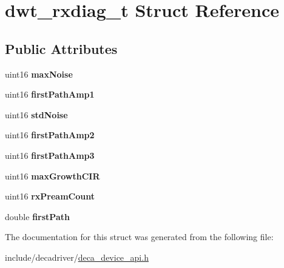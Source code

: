 \hypertarget{structdwt__rxdiag__t}{\section{dwt\-\_\-rxdiag\-\_\-t Struct Reference}
\label{structdwt__rxdiag__t}
}
\subsection*{Public Attributes}
\begin{DoxyCompactItemize}
\item 
\hypertarget{structdwt__rxdiag__t_a32a5fc72dfe82b86973ae87178a67f6a}{uint16 {\bfseries max\-Noise}}\label{structdwt__rxdiag__t_a32a5fc72dfe82b86973ae87178a67f6a}

\item 
\hypertarget{structdwt__rxdiag__t_afdb8dd31f35a945e5033ab6c8d0ff16f}{uint16 {\bfseries first\-Path\-Amp1}}\label{structdwt__rxdiag__t_afdb8dd31f35a945e5033ab6c8d0ff16f}

\item 
\hypertarget{structdwt__rxdiag__t_aaa648780865ce897405deb3d859e7404}{uint16 {\bfseries std\-Noise}}\label{structdwt__rxdiag__t_aaa648780865ce897405deb3d859e7404}

\item 
\hypertarget{structdwt__rxdiag__t_a3cf15d00a34f03f810617dd252b26c3b}{uint16 {\bfseries first\-Path\-Amp2}}\label{structdwt__rxdiag__t_a3cf15d00a34f03f810617dd252b26c3b}

\item 
\hypertarget{structdwt__rxdiag__t_a5a2cfa5b6bcd6dfdde9ccbb39d10ab3b}{uint16 {\bfseries first\-Path\-Amp3}}\label{structdwt__rxdiag__t_a5a2cfa5b6bcd6dfdde9ccbb39d10ab3b}

\item 
\hypertarget{structdwt__rxdiag__t_abb20de7dba5c3f5bc8990d6bf8cdac3c}{uint16 {\bfseries max\-Growth\-C\-I\-R}}\label{structdwt__rxdiag__t_abb20de7dba5c3f5bc8990d6bf8cdac3c}

\item 
\hypertarget{structdwt__rxdiag__t_a9dc2f8f55941b96149682504ed3e0f34}{uint16 {\bfseries rx\-Pream\-Count}}\label{structdwt__rxdiag__t_a9dc2f8f55941b96149682504ed3e0f34}

\item 
\hypertarget{structdwt__rxdiag__t_a5313f288a19ce93989ce7e5e6d4cbfcf}{double {\bfseries first\-Path}}\label{structdwt__rxdiag__t_a5313f288a19ce93989ce7e5e6d4cbfcf}

\end{DoxyCompactItemize}


The documentation for this struct was generated from the following file\-:\begin{DoxyCompactItemize}
\item 
include/decadriver/\hyperlink{deca__device__api_8h}{deca\-\_\-device\-\_\-api.\-h}\end{DoxyCompactItemize}
